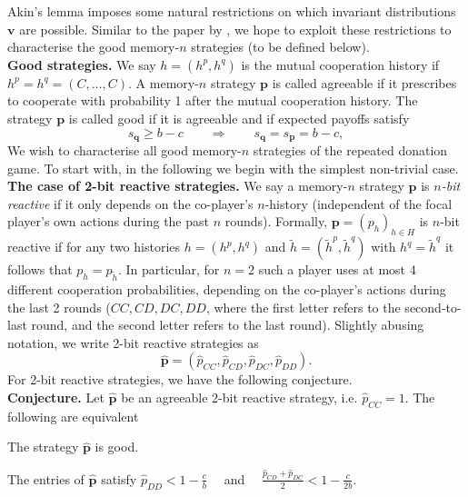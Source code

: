 \documentclass{article}
\theoremstyle{definition}
\begin{document}
Akin's lemma imposes some natural restrictions on which invariant distributions $\mathbf{v}$ are possible. Similar to the paper by \citep{akin:EGADS:2016}, we hope to exploit these restrictions to characterise the good memory-$n$ strategies (to be defined below).\\

\noindent
{\bf Good strategies.} 
We say $h\!=\!(h^p,h^q)$ is the mutual cooperation history if $h^p\!=\!h^q\!=\!(C,\ldots,C)$. 
A memory-$n$ strategy $\mathbf{p}$ is called agreeable if it prescribes to cooperate with probability 1 after the mutual cooperation history. 
The strategy $\mathbf{p}$ is called good if it is agreeable and if expected payoffs satisfy
\begin{equation} \label{Eq:good}
    s_{\mathbf{q}} \geq b\!-\!c \qquad \Rightarrow \qquad s_{\mathbf{q}} = s_{\mathbf{p}} =  b\!-\!c,
\end{equation}
We wish to characterise all good memory-$n$ strategies of the repeated donation game. To start with, in the following we begin with the simplest non-trivial case.\\

\noindent
{\bf The case of 2-bit reactive strategies.} 
We say a memory-$n$ strategy $\mathbf{p}$ is {\it $n$-bit reactive} if it only depends on the co-player's $n$-history (independent of the focal player's own actions during the past $n$ rounds). Formally, $\mathbf{p}\!=\!(p_h)_{h \in H}$ is $n$-bit reactive if for any two histories $h=(h^p,h^q)$ and $\tilde{h}=(\tilde{h}^p,\tilde{h}^q)$ with $h^q=\tilde{h}^q$ it follows that $p_h = p_{\tilde{h}}$. In particular, for $n\!=\!2$ such a player uses at most 4 different cooperation probabilities, depending on the co-player's actions during the last 2 rounds ($CC, CD, DC, DD$, where the first letter refers to the second-to-last round, and the second letter refers to the last round). Slightly abusing notation, we write 2-bit reactive strategies as 
\begin{equation}
\mathbf{\hat{p}} = (\hat{p}_{CC}, \hat{p}_{CD}, \hat{p}_{DC}, \hat{p}_{DD}). 
\end{equation}
For 2-bit reactive strategies, we have the following conjecture.\\

\noindent
{\bf Conjecture.}
Let $\mathbf{\hat{p}}$ be an agreeable 2-bit reactive strategy, i.e. $\hat{p}_{CC}\!=\!1$. The following are equivalent\\[-0.7cm]
\begin{description} \setlength\itemsep{0pt}
\item[({\it i})] The strategy $\mathbf{\hat{p}}$ is good.
\item[({\it ii})] The entries of $\mathbf{\hat{p}}$ satisfy $\displaystyle \hat{p}_{DD} < 1\!-\! \frac{c}{b}$  ~~and~~ $\displaystyle \frac{\hat{p}_{CD} + \hat{p}_{DC}}{2} < 1-\frac{c}{2b}$.
\end{description}
\end{document}
